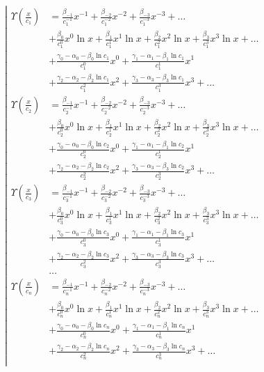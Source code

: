 \begin{equation*} \left| \begin{aligned}
\Upsilon{\left (\frac{x}{c_1} \right)} &=
  \frac{\beta_{-1}}{c_1^{-1}} x^{-1}
+ \frac{\beta_{-2}}{c_1^{-2}} x^{-2}
+ \frac{\beta_{-3}}{c_1^{-3}} x^{-3}
+ \ldots \\ &
+ \frac{\beta_0}{c_1^0} x^0 \ln{x}
+ \frac{\beta_1}{c_1^1} x^1 \ln{x}
+ \frac{\beta_2}{c_1^2} x^2 \ln{x}
+ \frac{\beta_3}{c_1^3} x^3 \ln{x}
+ \ldots \\ &
+ \frac{\gamma_0 - \alpha_0 - \beta_0 \ln{c_1}}{c_1^0} x^0
+ \frac{\gamma_1 - \alpha_1 - \beta_1 \ln{c_1}}{c_1^1} x^1 \\ &
+ \frac{\gamma_2 - \alpha_2 - \beta_2 \ln{c_1}}{c_1^2} x^2
+ \frac{\gamma_3 - \alpha_3 - \beta_3 \ln{c_1}}{c_1^3} x^3
+ \ldots \\
%
\Upsilon{\left (\frac{x}{c_2} \right)} &=
  \frac{\beta_{-1}}{c_2^{-1}} x^{-1}
+ \frac{\beta_{-2}}{c_2^{-2}} x^{-2}
+ \frac{\beta_{-3}}{c_2^{-3}} x^{-3}
+ \ldots \\ &
+ \frac{\beta_0}{c_2^0} x^0 \ln{x}
+ \frac{\beta_1}{c_2^1} x^1 \ln{x}
+ \frac{\beta_2}{c_2^2} x^2 \ln{x}
+ \frac{\beta_3}{c_2^3} x^3 \ln{x}
+ \ldots \\ &
+ \frac{\gamma_0 - \alpha_0 - \beta_0 \ln{c_2}}{c_2^0} x^0
+ \frac{\gamma_1 - \alpha_1 - \beta_1 \ln{c_2}}{c_2^1} x^1 \\ &
+ \frac{\gamma_2 - \alpha_2 - \beta_2 \ln{c_2}}{c_2^2} x^2
+ \frac{\gamma_3 - \alpha_3 - \beta_3 \ln{c_2}}{c_2^3} x^3
+ \ldots \\
%
\Upsilon{\left (\frac{x}{c_3} \right)} &=
  \frac{\beta_{-1}}{c_3^{-1}} x^{-1}
+ \frac{\beta_{-2}}{c_3^{-2}} x^{-2}
+ \frac{\beta_{-3}}{c_3^{-3}} x^{-3}
+ \ldots \\ &
+ \frac{\beta_0}{c_3^0} x^0 \ln{x}
+ \frac{\beta_1}{c_3^1} x^1 \ln{x}
+ \frac{\beta_2}{c_3^2} x^2 \ln{x}
+ \frac{\beta_3}{c_3^3} x^3 \ln{x}
+ \ldots \\ &
+ \frac{\gamma_0 - \alpha_0 - \beta_0 \ln{c_3}}{c_3^0} x^0
+ \frac{\gamma_1 - \alpha_1 - \beta_1 \ln{c_3}}{c_3^1} x^1 \\ &
+ \frac{\gamma_2 - \alpha_2 - \beta_2 \ln{c_3}}{c_3^2} x^2
+ \frac{\gamma_3 - \alpha_3 - \beta_3 \ln{c_3}}{c_3^3} x^3
+ \ldots \\
%
&\ldots \\
%
\Upsilon{\left (\frac{x}{c_n} \right)} &=
  \frac{\beta_{-1}}{c_n^{-1}} x^{-1}
+ \frac{\beta_{-2}}{c_n^{-2}} x^{-2}
+ \frac{\beta_{-3}}{c_n^{-3}} x^{-3}
+ \ldots \\ &
+ \frac{\beta_0}{c_n^0} x^0 \ln{x}
+ \frac{\beta_1}{c_n^1} x^1 \ln{x}
+ \frac{\beta_2}{c_n^2} x^2 \ln{x}
+ \frac{\beta_3}{c_n^3} x^3 \ln{x}
+ \ldots \\ &
+ \frac{\gamma_0 - \alpha_0 - \beta_0 \ln{c_n}}{c_n^0} x^0
+ \frac{\gamma_1 - \alpha_1 - \beta_1 \ln{c_n}}{c_n^1} x^1 \\ &
+ \frac{\gamma_2 - \alpha_2 - \beta_2 \ln{c_n}}{c_n^2} x^2
+ \frac{\gamma_3 - \alpha_3 - \beta_3 \ln{c_n}}{c_n^3} x^3
+ \ldots \\
\end{aligned} \right. \end{equation*}

